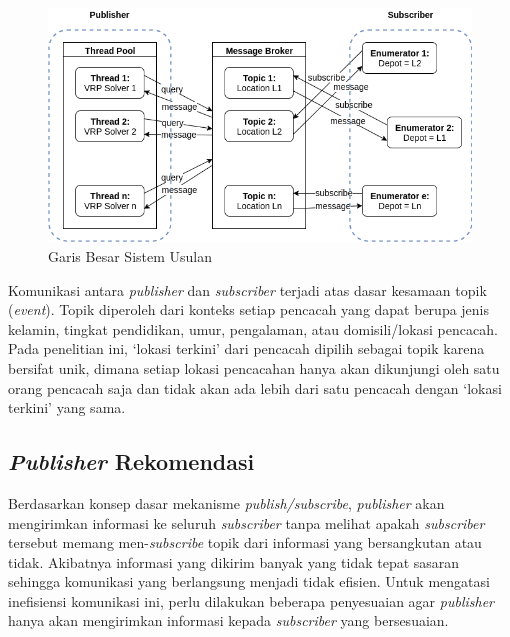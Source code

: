 \begin{figure}[!]
	\centering
	\includegraphics[width=\textwidth]{Resources/Images/system-overview}
	\captionsetup{format=hang}
	\caption{Garis Besar Sistem Usulan}
	\label{fig:system-overview}
\end{figure}


Komunikasi antara \textit{publisher} dan \textit{subscriber} terjadi atas dasar kesamaan topik (\textit{event}). Topik diperoleh dari konteks setiap pencacah yang dapat berupa jenis kelamin, tingkat pendidikan, umur, pengalaman, atau domisili/lokasi pencacah. Pada penelitian ini, `lokasi terkini' dari pencacah dipilih sebagai topik karena bersifat unik, dimana setiap lokasi pencacahan hanya akan dikunjungi oleh satu orang pencacah saja dan tidak akan ada lebih dari satu pencacah dengan `lokasi terkini' yang sama.


\subsection{\textit{Publisher} Rekomendasi}
\label{ssec:publisher}
Berdasarkan konsep dasar mekanisme \textit{publish/subscribe}, \textit{publisher} akan mengirimkan informasi ke seluruh \textit{subscriber} tanpa melihat apakah \textit{subscriber} tersebut memang men-\textit{subscribe} topik dari informasi yang bersangkutan atau tidak. Akibatnya informasi yang dikirim banyak yang tidak tepat sasaran sehingga komunikasi yang berlangsung menjadi tidak efisien. Untuk mengatasi inefisiensi komunikasi ini, perlu dilakukan beberapa penyesuaian agar \textit{publisher} hanya akan mengirimkan informasi kepada \textit{subscriber} yang bersesuaian. 

